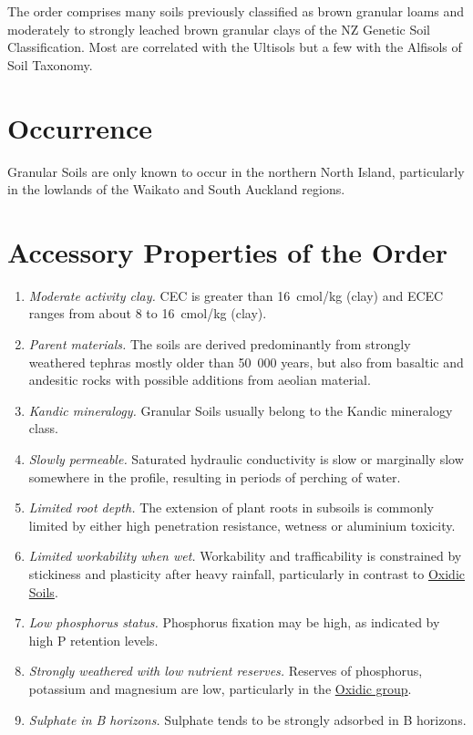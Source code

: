 \documentclass[
  letterpaper,
  DIV=11,
  numbers=noendperiod]{scrreprt}
\providecommand{\tightlist}{%
  \setlength{\itemsep}{0pt}\setlength{\parskip}{0pt}}\usepackage{longtable,booktabs,array}
\begin{document}
The order comprises many soils previously classified as brown granular
loams and moderately to strongly leached brown granular clays of the NZ
Genetic Soil Classification. Most are correlated with the Ultisols but a
few with the Alfisols of Soil Taxonomy.

\hypertarget{sec-occ-N}{%
\section{Occurrence}\label{sec-occ-N}}

Granular Soils are only known to occur in the northern North Island,
particularly in the lowlands of the Waikato and South Auckland regions.

\hypertarget{sec-acc-N}{%
\section{Accessory Properties of the Order}\label{sec-acc-N}}

\begin{enumerate}
\def\labelenumi{\arabic{enumi}.}
\tightlist
\item
  \emph{Moderate activity clay.} CEC is greater than 16~cmol/kg (clay)
  and ECEC ranges from about 8 to 16~cmol/kg (clay).
\item
  \emph{Parent materials.} The soils are derived predominantly from
  strongly weathered tephras mostly older than 50~000 years, but also
  from basaltic and andesitic rocks with possible additions from aeolian
  material.
\item
  \emph{Kandic mineralogy.} Granular Soils usually belong to the Kandic
  mineralogy class.
\item
  \emph{Slowly permeable.} Saturated hydraulic conductivity is slow or
  marginally slow somewhere in the profile, resulting in periods of
  perching of water.
\item
  \emph{Limited root depth.} The extension of plant roots in subsoils is
  commonly limited by either high penetration resistance, wetness or
  aluminium toxicity.
\item
  \emph{Limited workability when wet.} Workability and trafficability is
  constrained by stickiness and plasticity after heavy rainfall,
  particularly in contrast to \protect\hyperlink{sec-X}{Oxidic Soils}.
\item
  \emph{Low phosphorus status.} Phosphorus fixation may be high, as
  indicated by high P retention levels.
\item
  \emph{Strongly weathered with low nutrient reserves.} Reserves of
  phosphorus, potassium and magnesium are low, particularly in the
  \protect\hyperlink{sec-NX}{Oxidic group}.
\item
  \emph{Sulphate in B horizons.} Sulphate tends to be strongly adsorbed
  in B horizons.
\end{enumerate}
\end{document}
